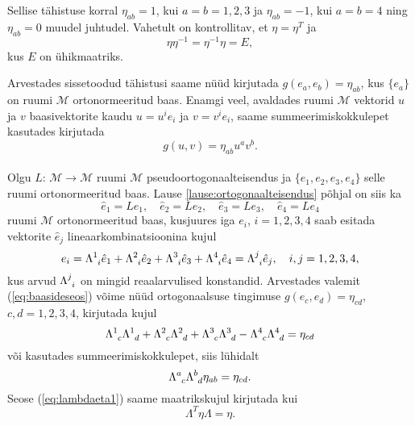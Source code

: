 \documentclass[12pt,a4paper,oneside]{article}
\theoremstyle{plain}
\theoremstyle{definition}
\numberwithin{equation}{section}
\def\M{{\mathcal M}}
\begin{document}
Sellise tähistuse korral $\eta_{ab} = 1$, kui $a = b = 1, 2, 3$ ja 
$\eta_{ab} = -1$, kui $a = b = 4$ ning $\eta_{ab} = 0$ muudel 
juhtudel. Vahetult on kontrollitav, et $\eta = \eta^T$ ja 
\[\eta \eta^{-1} = \eta^{-1} \eta = E,\] 
kus $E$ on ühikmaatriks.

Arvestades sissetoodud tähistusi saame nüüd kirjutada 
$g\left(e_a, e_b\right) = \eta_{ab}$, kus $\{e_a\}$ on ruumi $\M$ 
ortonormeeritud baas. Enamgi veel, avaldades ruumi $\M$ vektorid 
$u$ ja $v$ baasivektorite kaudu $u = u^i e_i$ ja $v = v^i e_i$, 
saame summeerimiskokkulepet kasutades kirjutada 
\[g \left(u, v\right) = \eta_{ab} u^a v^b.\]

\paragraph{} Olgu $L \colon\, \M \rightarrow \M$ ruumi $\M$ 
pseudoortogonaalteisendus ja $\{e_1, e_2, e_3, e_4\}$ selle ruumi 
ortonormeeritud baas. Lause \ref{lause:ortogonaalteisendus} põhjal 
on siis ka 
\[\hat{e}_1 = Le_1,\quad \hat{e}_2  = Le_2,\quad \hat{e}_3 = Le_3, \quad
\hat{e}_4 = Le_4\] 
ruumi $\M$ ortonormeeritud baas, kusjuures iga 
$e_i$, $i = 1,2,3,4$ saab esitada vektorite $\hat{e}_j$ 
lineaarkombinatsioonina kujul
\begin{equation} \label{eq:baasideseos}
e_i = \Lambda\indices{^1_i} \hat{e}_1 + \Lambda\indices{^2_i} 
\hat{e}_2 + \Lambda\indices{^3_i} \hat{e}_3 + \Lambda\indices{^4_i} 
\hat{e}_4 = \Lambda\indices{^j_i} \hat{e}_j, \quad i,j = 1, 2, 3, 4,
\end{equation}
kus arvud $\Lambda\indices{^j_i}$ on mingid reaalarvulised konstandid. 
Arvestades valemit (\ref{eq:baasideseos}) võime nüüd ortogonaalsuse 
tingimuse $g \left(e_c, e_d\right) = \eta_{cd}$, $c, d = 1, 2, 3, 4$, 
kirjutada kujul
\begin{equation*}
\Lambda\indices{^1_c} \Lambda\indices{^1_d} + \Lambda\indices{^2_c} 
\Lambda\indices{^2_d} + \Lambda\indices{^3_c} \Lambda\indices{^3_d} - 
\Lambda\indices{^4_c} \Lambda\indices{^4_d} = \eta_{cd}
\end{equation*}
või kasutades summeerimiskokkulepet, siis lühidalt
\begin{equation} \label{eq:lambdaeta1}
\Lambda\indices{^a_c} \Lambda\indices{^b_d} \eta_{ab} = \eta_{cd}.
\end{equation}
Seose (\ref{eq:lambdaeta1}) saame maatrikskujul kirjutada kui
\begin{equation} \label{eq:lambdaetamat1}
\Lambda^T \eta \Lambda = \eta.
\end{equation}
\end{document}
